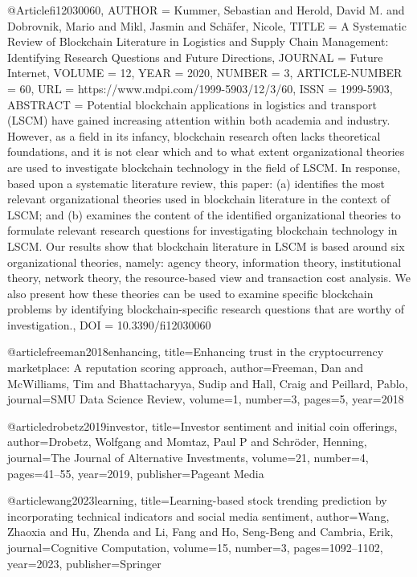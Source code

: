 @Article{fi12030060,
AUTHOR = {Kummer, Sebastian and Herold, David M. and Dobrovnik, Mario and Mikl, Jasmin and Schäfer, Nicole},
TITLE = {A Systematic Review of Blockchain Literature in Logistics and Supply Chain Management: Identifying Research Questions and Future Directions},
JOURNAL = {Future Internet},
VOLUME = {12},
YEAR = {2020},
NUMBER = {3},
ARTICLE-NUMBER = {60},
URL = {https://www.mdpi.com/1999-5903/12/3/60},
ISSN = {1999-5903},
ABSTRACT = {Potential blockchain applications in logistics and transport (LSCM) have gained increasing attention within both academia and industry. However, as a field in its infancy, blockchain research often lacks theoretical foundations, and it is not clear which and to what extent organizational theories are used to investigate blockchain technology in the field of LSCM. In response, based upon a systematic literature review, this paper: (a) identifies the most relevant organizational theories used in blockchain literature in the context of LSCM; and (b) examines the content of the identified organizational theories to formulate relevant research questions for investigating blockchain technology in LSCM. Our results show that blockchain literature in LSCM is based around six organizational theories, namely: agency theory, information theory, institutional theory, network theory, the resource-based view and transaction cost analysis. We also present how these theories can be used to examine specific blockchain problems by identifying blockchain-specific research questions that are worthy of investigation.},
DOI = {10.3390/fi12030060}
}

@article{freeman2018enhancing,
  title={Enhancing trust in the cryptocurrency marketplace: A reputation scoring approach},
  author={Freeman, Dan and McWilliams, Tim and Bhattacharyya, Sudip and Hall, Craig and Peillard, Pablo},
  journal={SMU Data Science Review},
  volume={1},
  number={3},
  pages={5},
  year={2018}
}

@article{drobetz2019investor,
  title={Investor sentiment and initial coin offerings},
  author={Drobetz, Wolfgang and Momtaz, Paul P and Schr{\"o}der, Henning},
  journal={The Journal of Alternative Investments},
  volume={21},
  number={4},
  pages={41--55},
  year={2019},
  publisher={Pageant Media}
}

@article{wang2023learning,
  title={Learning-based stock trending prediction by incorporating technical indicators and social media sentiment},
  author={Wang, Zhaoxia and Hu, Zhenda and Li, Fang and Ho, Seng-Beng and Cambria, Erik},
  journal={Cognitive Computation},
  volume={15},
  number={3},
  pages={1092--1102},
  year={2023},
  publisher={Springer}
}

